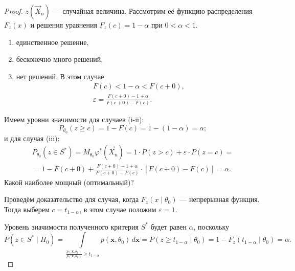 \begin{proof}
  $ z(\vec X_n) $ --- случайная величина. Рассмотрим её функцию распределения $
  F_z(x) $ и решения уравнения $ F_z(c) = 1-\alpha $ при $ 0 < \alpha < 1 $.
  \begin{enumerate}[label=(\roman*)]	
    \item единственное решение,

    \item бесконечно много решений,

    \item нет решений.
      В этом случае  
      \begin{gather*}
          F(c) < 1 - \alpha < F(c+0), \\
          \varepsilon = \frac{F(c+0) - 1 + \alpha}{F(c+0) - F(c)}.
      \end{gather*}
  \end{enumerate}

  Имеем уровни значимости для случаев (i-ii): 
  \[
    P_{\theta_0} (z \geqslant c) = 1 - F(c) = 1 - (1 - \alpha) =
    \alpha;
  \]
  и для случая (iii):
  \begin{multline*}
    P_{\theta_0}(z\in S^\ast) = M_{\theta_0} \varphi^\ast(\vec
    X_n) = 1 \cdot P(z > c) + \varepsilon \cdot P(z = c) =\\= 1 - F(c + 0) +
    \frac{F(c+0) - 1 + \alpha}{F(c+0) - F(c)}\cdot \left[ F(c+0) - F(c) \right] =
    \alpha.
  \end{multline*}
  Какой наиболее мощный (оптимальный)?

  Проведём доказательство для случая, когда $ F_z(x\mid \theta_0) $ ---
  непрерывная функция. Тогда выберем $ c = t_{1-\alpha} $, в этом случае положим
  $ \varepsilon = 1 $.

  Уровень значимости полученного критерия $ S^\ast $ будет равен $ \alpha $,
  поскольку  
  \[
      P(z\in S^\ast \mid H_0) = \int\limits_{\frac{p(\mathbf x,
      \theta_0)}{p(\mathbf x, \theta_0)} \geqslant t_{1-\alpha}} p(\mathbf x,
      \theta_0) \,d\mathbf x = P(z \geqslant t_{1-\alpha} \mid \theta_0) = 1 -
      F_z(t_{1-\alpha} \mid \theta_0) = \alpha.
  \]


\end{proof}

